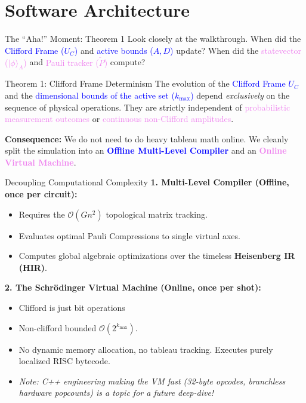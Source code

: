 \documentclass[11pt, aspectratio=169]{beamer}
\begin{document}
\section{Software Architecture}

\begin{frame}{The ``Aha!'' Moment: Theorem 1}
  Look closely at the walkthrough.
  When did the \textcolor{blue}{Clifford Frame ($U_C$)} and \textcolor{blue}{active bounds ($A, D$)} update?
  When did the \textcolor{violet}{statevector ($|\phi\rangle_A$)} and \textcolor{violet}{Pauli tracker ($\tilde{P}$)} compute?

  \vspace{1em}
  \begin{alertblock}{Theorem 1: Clifford Frame Determinism}
      The evolution of the \textcolor{blue}{Clifford Frame $U_C$} and the \textcolor{blue}{dimensional bounds of the active set ($k_{\max}$)} depend \textit{exclusively} on the sequence of physical operations. They are strictly independent of \textcolor{violet}{probabilistic measurement outcomes} or \textcolor{violet}{continuous non-Clifford amplitudes}.
  \end{alertblock}

  \vspace{1em}
  \textbf{Consequence:} We do not need to do heavy tableau math online. We cleanly split the simulation into an \textbf{\textcolor{blue}{Offline Multi-Level Compiler}} and an \textbf{\textcolor{violet}{Online Virtual Machine}}.
\end{frame}

\begin{frame}{Decoupling Computational Complexity}
  \textbf{1. Multi-Level Compiler (Offline, once per circuit):}
  \begin{itemize}
      \item Requires the $\mathcal{O}(G n^2)$ topological matrix tracking.
      \item Evaluates optimal Pauli Compressions to single virtual axes.
      \item Computes global algebraic optimizations over the timeless \textbf{Heisenberg IR (HIR)}.
  \end{itemize}

  \vspace{1em}
  \textbf{2. The Schrödinger Virtual Machine (Online, once per shot):}
  \begin{itemize}
      \item Clifford is just bit operations
      \item Non-clifford bounded $\mathcal{O}(2^{k_{\max}})$.
      \item No dynamic memory allocation, no tableau tracking. Executes purely localized RISC bytecode.
      \item \textit{Note: C++ engineering making the VM fast (32-byte opcodes, branchless hardware popcounts) is a topic for a future deep-dive!}
  \end{itemize}
\end{frame}
\end{document}
